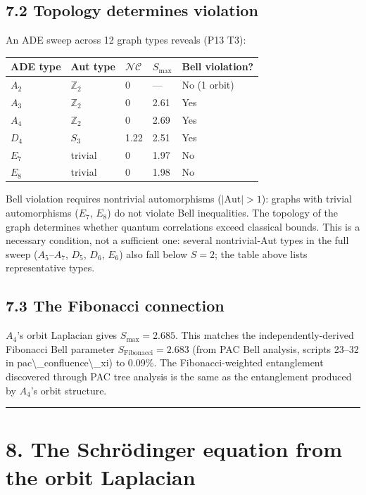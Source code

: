 \documentclass[11pt,a4paper]{article}
\begin{document}
\subsection*{7.2 Topology determines violation}

An ADE sweep across 12 graph types reveals (P13 T3):

\begin{longtable}[]{@{}lllll@{}}
\toprule
ADE type & Aut type & $\mathcal{NC}$ & $S_{\text{max}}$ & Bell violation? \\
\midrule\endhead
$A_2$ & $\mathbb{Z}_2$ & 0 & — & No (1 orbit) \\
$A_3$ & $\mathbb{Z}_2$ & 0 & 2.61 & Yes \\
$A_4$ & $\mathbb{Z}_2$ & 0 & 2.69 & Yes \\
$D_4$ & $S_3$ & 1.22 & 2.51 & Yes \\
$E_7$ & trivial & 0 & 1.97 & No \\
$E_8$ & trivial & 0 & 1.98 & No \\
\bottomrule
\end{longtable}

Bell violation requires nontrivial automorphisms ($|\text{Aut}| > 1$): graphs with trivial automorphisms ($E_7$, $E_8$) do not violate Bell inequalities. The topology of the graph determines whether quantum correlations exceed classical bounds. This is a necessary condition, not a sufficient one: several nontrivial-Aut types in the full sweep ($A_5$–$A_7$, $D_5$, $D_6$, $E_6$) also fall below $S = 2$; the table above lists representative types.

\subsection*{7.3 The Fibonacci connection}

$A_4$'s orbit Laplacian gives $S_{\text{max}} = 2.685$. This matches the independently-derived Fibonacci Bell parameter $S_{\text{Fibonacci}} = 2.683$ (from PAC Bell analysis, scripts 23–32 in pac\textbackslash{}\_confluence\textbackslash{}\_xi) to 0.09\%. The Fibonacci-weighted entanglement discovered through PAC tree analysis is the same as the entanglement produced by $A_4$'s orbit structure.

\begin{center}\rule{0.5\linewidth}{0.4pt}\end{center}

\section*{8. The Schrödinger equation from the orbit Laplacian}
\end{document}
